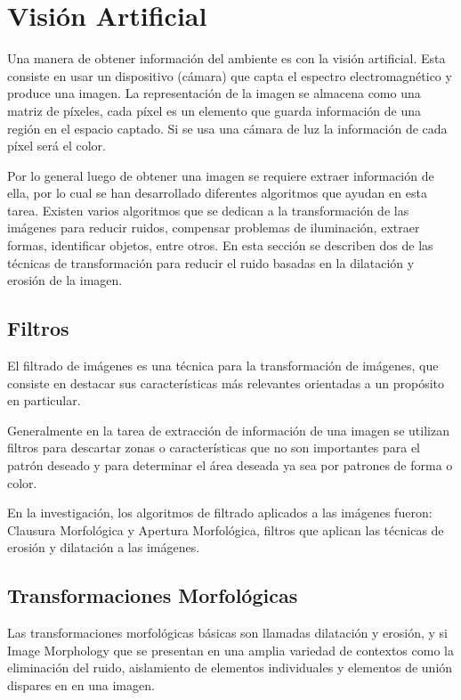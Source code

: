 \section{Visión Artificial} \label{sect:Vision_Artificial}

Una manera de obtener información del ambiente es con la visión artificial. Esta consiste en usar un dispositivo (cámara) que
capta el espectro electromagnético y produce una imagen. La representación de la imagen se almacena como una matriz de píxeles,
cada píxel es un elemento que guarda información de una región en el espacio captado. Si se usa una cámara de luz la información
de cada píxel será el color. \cite{AiRobotics}  

Por lo general luego de obtener una imagen se requiere extraer información de ella, por lo cual se han desarrollado diferentes
algoritmos que ayudan en esta tarea. Existen varios algoritmos que se dedican a la transformación de las imágenes para reducir
ruidos, compensar problemas de iluminación, extraer formas, identificar objetos, entre otros. En esta sección se describen dos
de las técnicas de transformación para reducir el ruido basadas en la dilatación y erosión de la imagen. 

\subsection{Filtros }
El filtrado de imágenes es una técnica para la transformación de imágenes, que consiste en destacar  sus características más relevantes orientadas a un propósito en particular. 

Generalmente en la tarea de extracción de información de una imagen se utilizan filtros para descartar zonas o características que no son importantes para el patrón deseado y para determinar el área deseada ya sea por patrones de forma o color.

En la investigación, los algoritmos de filtrado aplicados a las imágenes fueron: Clausura Morfológica y Apertura Morfológica, filtros que aplican las técnicas de erosión y dilatación a las imágenes.

\subsection{Transformaciones Morfológicas}
Las transformaciones morfológicas básicas son llamadas dilatación y erosión, y si Image Morphology que se presentan en una
amplia variedad de contextos como la eliminación del ruido, aislamiento de elementos individuales y elementos de unión dispares
en en una imagen.\cite{BookOpenCv}

